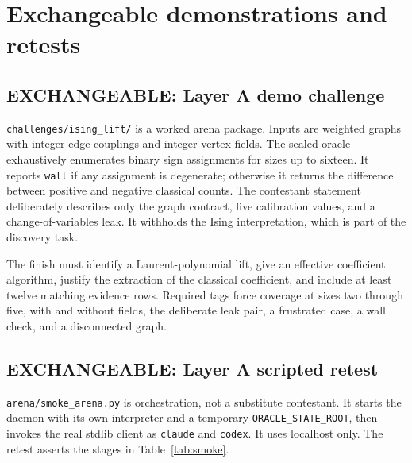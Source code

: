 \documentclass[11pt]{article}
\newcommand{\code}[1]{\texttt{#1}}
\newcommand{\exchangeable}{\textbf{\textcolor{InstanceLine}{EXCHANGEABLE}}}
\begin{document}
\clearpage

\section{Exchangeable demonstrations and retests}

\subsection{\exchangeable: Layer A demo challenge}

\code{challenges/ising\_lift/} is a worked arena package.  Inputs are weighted
graphs with integer edge couplings and integer vertex fields.  The sealed
oracle exhaustively enumerates binary sign assignments for sizes up to
sixteen.  It reports \code{wall} if any assignment is degenerate; otherwise
it returns the difference between positive and negative classical counts.
The contestant statement deliberately describes only the graph contract,
five calibration values, and a change-of-variables leak.  It withholds the
Ising interpretation, which is part of the discovery task.

The finish must identify a Laurent-polynomial lift, give an effective
coefficient algorithm, justify the extraction of the classical coefficient,
and include at least twelve matching evidence rows.  Required tags force
coverage at sizes two through five, with and without fields, the deliberate
leak pair, a frustrated case, a wall check, and a disconnected graph.

\subsection{\exchangeable: Layer A scripted retest}

\code{arena/smoke\_arena.py} is orchestration, not a substitute contestant.
It starts the daemon with its own interpreter and a temporary
\code{ORACLE\_STATE\_ROOT}, then invokes the real stdlib client as
\code{claude} and \code{codex}.  It uses localhost only.  The retest asserts
the stages in Table~\ref{tab:smoke}.
\end{document}
